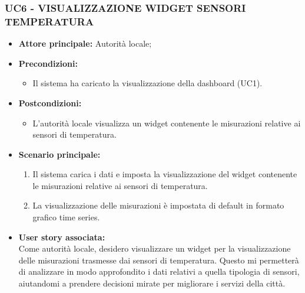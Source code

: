 \subsubsection{UC6 - VISUALIZZAZIONE WIDGET SENSORI TEMPERATURA}
\begin{itemize}
    \item \textbf{Attore principale:} Autorità locale;
    \item \textbf{Precondizioni:}
        \begin{itemize}
            \item Il sistema ha caricato la visualizzazione della dashboard (UC1).
        \end{itemize}
    \item \textbf{Postcondizioni:}
        \begin{itemize}
            \item L'autorità locale visualizza un widget contenente le misurazioni relative ai sensori di temperatura.
        \end{itemize}
        \item \textbf{Scenario principale:}
        \begin{enumerate}
            \item Il sistema carica i dati e imposta la visualizzazione del widget contenente le misurazioni relative ai sensori di temperatura.
            \item La visualizzazione delle misurazioni è impostata di default in formato grafico time series.
        \end{enumerate}
    \item \textbf{User story associata:} \\
        Come autorità locale, desidero visualizzare un widget per la visualizzazione delle misurazioni trasmesse dai sensori di temperatura. Questo mi permetterà di analizzare in modo approfondito i dati relativi a quella tipologia di sensori, aiutandomi a prendere decisioni mirate per migliorare i servizi della città.
\end{itemize}